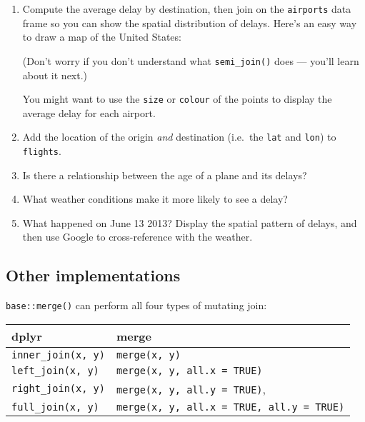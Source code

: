 \documentclass[]{book}
\newenvironment{Shaded}{\begin{snugshade}}{\end{snugshade}}
\newcommand{\KeywordTok}[1]{\textcolor[rgb]{0.13,0.29,0.53}{\textbf{{#1}}}}
\newcommand{\StringTok}[1]{\textcolor[rgb]{0.31,0.60,0.02}{{#1}}}
\newcommand{\NormalTok}[1]{{#1}}
\begin{document}
\begin{enumerate}
\def\labelenumi{\arabic{enumi}.}
\item
  Compute the average delay by destination, then join on the
  \texttt{airports} data frame so you can show the spatial distribution
  of delays. Here's an easy way to draw a map of the United States:

\begin{Shaded}
\end{Shaded}

  (Don't worry if you don't understand what \texttt{semi\_join()} does
  --- you'll learn about it next.)

  You might want to use the \texttt{size} or \texttt{colour} of the
  points to display the average delay for each airport.
\item
  Add the location of the origin \emph{and} destination (i.e.~the
  \texttt{lat} and \texttt{lon}) to \texttt{flights}.
\item
  Is there a relationship between the age of a plane and its delays?
\item
  What weather conditions make it more likely to see a delay?
\item
  What happened on June 13 2013? Display the spatial pattern of delays,
  and then use Google to cross-reference with the weather.
\end{enumerate}

\subsection{Other implementations}\label{other-implementations}

\texttt{base::merge()} can perform all four types of mutating join:

\begin{longtable}[]{@{}ll@{}}
\toprule
dplyr & merge\tabularnewline
\midrule
\endhead
\texttt{inner\_join(x,\ y)} & \texttt{merge(x,\ y)}\tabularnewline
\texttt{left\_join(x,\ y)} &
\texttt{merge(x,\ y,\ all.x\ =\ TRUE)}\tabularnewline
\texttt{right\_join(x,\ y)} &
\texttt{merge(x,\ y,\ all.y\ =\ TRUE)},\tabularnewline
\texttt{full\_join(x,\ y)} &
\texttt{merge(x,\ y,\ all.x\ =\ TRUE,\ all.y\ =\ TRUE)}\tabularnewline
\bottomrule
\end{longtable}
\end{document}
